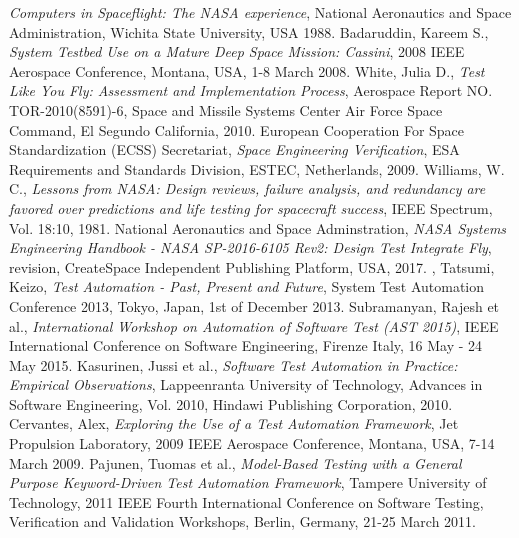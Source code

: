 \documentclass[english,12pt,a4paper,pdftex,elec,utf8]{aaltothesis}
\begin{document}
\begin{thebibliography}{99}
  \textit{Computers in Spaceflight: The NASA experience}, National Aeronautics and Space Administration, Wichita State University, USA 1988.
 Badaruddin, Kareem S.,
  \textit{System Testbed Use on a Mature Deep Space Mission: Cassini}, 2008 IEEE Aerospace Conference, Montana, USA, 1-8 March 2008.
 White, Julia D.,
  \textit{Test Like You Fly: Assessment and Implementation Process}, Aerospace Report NO.
TOR-2010(8591)-6, Space and Missile Systems Center Air Force Space Command, El Segundo California, 2010.
 European Cooperation For Space Standardization (ECSS) Secretariat,
  \textit{Space Engineering Verification}, ESA Requirements and Standards Division, ESTEC, Netherlands, 2009.
 Williams, W. C.,
  \textit{Lessons from NASA: Design reviews, failure analysis, and redundancy are favored over predictions and life testing for spacecraft success}, IEEE Spectrum, Vol. 18:10, 1981.
 National Aeronautics and Space Adminstration,
  \textit{NASA Systems Engineering Handbook - NASA SP-2016-6105 Rev2: Design Test Integrate Fly},  revision, CreateSpace Independent Publishing Platform, USA, 2017.
, Tatsumi, Keizo,
  \textit{Test Automation - Past, Present and Future}, System Test Automation Conference 2013,  Tokyo, Japan, 1st of December 2013.
 Subramanyan, Rajesh et al.,
  \textit{ International Workshop on Automation of Software Test (AST 2015)},  IEEE International Conference on Software Engineering, Firenze Italy, 16 May - 24 May 2015.
 Kasurinen, Jussi et al.,
  \textit{Software Test Automation in Practice: Empirical Observations}, Lappeenranta University of Technology, Advances in Software Engineering, Vol. 2010, Hindawi Publishing Corporation, 2010.
 Cervantes, Alex,
  \textit{Exploring the Use of a Test Automation Framework}, Jet Propulsion Laboratory, 2009 IEEE Aerospace Conference, Montana, USA, 7-14 March 2009.
 Pajunen, Tuomas et al.,
  \textit{Model-Based Testing with a General Purpose Keyword-Driven Test Automation
Framework}, Tampere University of Technology, 2011 IEEE Fourth International Conference on Software Testing, Verification and Validation Workshops, Berlin, Germany, 21-25 March 2011.  

\end{thebibliography}
\end{document}
